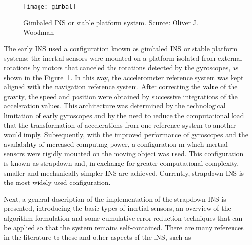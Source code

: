 \begin{figure}[!t]
    \centering
	\texttt{[image: gimbal]}    	
	\caption[Gimbaled INS or stable platform system]{Gimbaled INS or stable platform system. Source: Oliver J. Woodman~\cite{woodman_introduction_2007}.}
	\label{fig:gimbal}
\end{figure}
The early INS used a configuration known as gimbaled INS or stable platform systems: the inertial sensors were mounted on a platform isolated from external rotations by motors that canceled the rotations detected by the gyroscopes, as shown in the Figure~\ref{fig:gimbal}. 
In this way, the accelerometer reference system was kept aligned with the navigation reference system.
After correcting the value of the gravity, the speed and position were obtained by successive integrations of the acceleration values.
This architecture was determined by the technological limitation of early gyroscopes and by the need to reduce the computational load that the transformation of accelerations from one reference system to another would imply.
Subsequently, with the improved performance of gyroscopes and the availability of increased computing power, a configuration in which inertial sensors were rigidly mounted on the moving object was used. 
This configuration is known as strapdown and, in exchange for greater computational complexity, smaller and mechanically simpler INS are achieved.
Currently, strapdown INS is the most widely used configuration. 

Next, a general description of the implementation of the strapdown INS is presented, introducing the basic types of inertial sensors, an overview of the algorithm formulation and some cumulative error reduction techniques that can be applied so that the system remains self-contained.
There are many references in the literature to these and other aspects of the INS, such as \cite{grewal_global_2001, titterton_strapdown_2004, woodman_introduction_2007, groves_principles_2008, groves_navigation_2015}.
